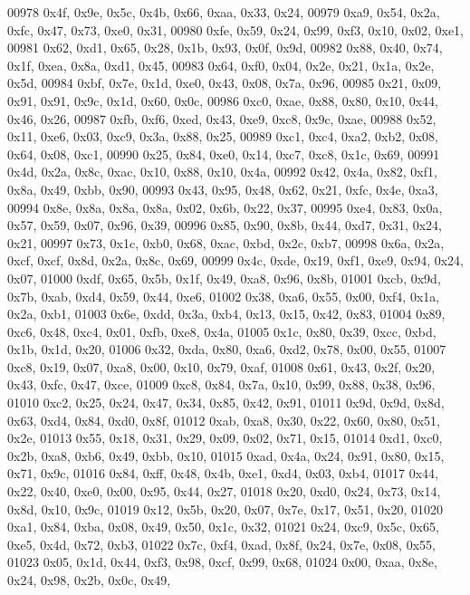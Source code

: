 \begin{DoxyCode}
00978   0x4f, 0x9e, 0x5c, 0x4b, 0x66, 0xaa, 0x33, 0x24,
00979   0xa9, 0x54, 0x2a, 0xfc, 0x47, 0x73, 0xe0, 0x31,
00980   0xfe, 0x59, 0x24, 0x99, 0xf3, 0x10, 0x02, 0xe1,
00981   0x62, 0xd1, 0x65, 0x28, 0x1b, 0x93, 0x0f, 0x9d,
00982   0x88, 0x40, 0x74, 0x1f, 0xea, 0x8a, 0xd1, 0x45,
00983   0x64, 0xf0, 0x04, 0x2e, 0x21, 0x1a, 0x2e, 0x5d,
00984   0xbf, 0x7e, 0x1d, 0xe0, 0x43, 0x08, 0x7a, 0x96,
00985   0x21, 0x09, 0x91, 0x91, 0x9c, 0x1d, 0x60, 0x0c,
00986   0xc0, 0xae, 0x88, 0x80, 0x10, 0x44, 0x46, 0x26,
00987   0xfb, 0xf6, 0xed, 0x43, 0xe9, 0xc8, 0x9c, 0xae,
00988   0x52, 0x11, 0xe6, 0x03, 0xc9, 0x3a, 0x88, 0x25,
00989   0xc1, 0xc4, 0xa2, 0xb2, 0x08, 0x64, 0x08, 0xc1,
00990   0x25, 0x84, 0xe0, 0x14, 0xc7, 0xc8, 0x1c, 0x69,
00991   0x4d, 0x2a, 0x8c, 0xac, 0x10, 0x88, 0x10, 0x4a,
00992   0x42, 0x4a, 0x82, 0xf1, 0x8a, 0x49, 0xbb, 0x90,
00993   0x43, 0x95, 0x48, 0x62, 0x21, 0xfc, 0x4e, 0xa3,
00994   0x8e, 0x8a, 0x8a, 0x8a, 0x02, 0x6b, 0x22, 0x37,
00995   0xe4, 0x83, 0x0a, 0x57, 0x59, 0x07, 0x96, 0x39,
00996   0x85, 0x90, 0x8b, 0x44, 0xd7, 0x31, 0x24, 0x21,
00997   0x73, 0x1c, 0xb0, 0x68, 0xac, 0xbd, 0x2c, 0xb7,
00998   0x6a, 0x2a, 0xcf, 0xcf, 0x8d, 0x2a, 0x8c, 0x69,
00999   0x4c, 0xde, 0x19, 0xf1, 0xe9, 0x94, 0x24, 0x07,
01000   0xdf, 0x65, 0x5b, 0x1f, 0x49, 0xa8, 0x96, 0x8b,
01001   0xcb, 0x9d, 0x7b, 0xab, 0xd4, 0x59, 0x44, 0xe6,
01002   0x38, 0xa6, 0x55, 0x00, 0xf4, 0x1a, 0x2a, 0xb1,
01003   0x6e, 0xdd, 0x3a, 0xb4, 0x13, 0x15, 0x42, 0x83,
01004   0x89, 0xc6, 0x48, 0xc4, 0x01, 0xfb, 0xe8, 0x4a,
01005   0x1c, 0x80, 0x39, 0xcc, 0xbd, 0x1b, 0x1d, 0x20,
01006   0x32, 0xda, 0x80, 0xa6, 0xd2, 0x78, 0x00, 0x55,
01007   0xc8, 0x19, 0x07, 0xa8, 0x00, 0x10, 0x79, 0xaf,
01008   0x61, 0x43, 0x2f, 0x20, 0x43, 0xfc, 0x47, 0xce,
01009   0xc8, 0x84, 0x7a, 0x10, 0x99, 0x88, 0x38, 0x96,
01010   0xc2, 0x25, 0x24, 0x47, 0x34, 0x85, 0x42, 0x91,
01011   0x9d, 0x9d, 0x8d, 0x63, 0xd4, 0x84, 0xd0, 0x8f,
01012   0xab, 0xa8, 0x30, 0x22, 0x60, 0x80, 0x51, 0x2e,
01013   0x55, 0x18, 0x31, 0x29, 0x09, 0x02, 0x71, 0x15,
01014   0xd1, 0xc0, 0x2b, 0xa8, 0xb6, 0x49, 0xbb, 0x10,
01015   0xad, 0x4a, 0x24, 0x91, 0x80, 0x15, 0x71, 0x9c,
01016   0x84, 0xff, 0x48, 0x4b, 0xe1, 0xd4, 0x03, 0xb4,
01017   0x44, 0x22, 0x40, 0xe0, 0x00, 0x95, 0x44, 0x27,
01018   0x20, 0xd0, 0x24, 0x73, 0x14, 0x8d, 0x10, 0x9c,
01019   0x12, 0x5b, 0x20, 0x07, 0x7e, 0x17, 0x51, 0x20,
01020   0xa1, 0x84, 0xba, 0x08, 0x49, 0x50, 0x1c, 0x32,
01021   0x24, 0xc9, 0x5c, 0x65, 0xe5, 0x4d, 0x72, 0xb3,
01022   0x7c, 0xf4, 0xad, 0x8f, 0x24, 0x7e, 0x08, 0x55,
01023   0x05, 0x1d, 0x44, 0xf3, 0x98, 0xcf, 0x99, 0x68,
01024   0x00, 0xaa, 0x8e, 0x24, 0x98, 0x2b, 0x0c, 0x49,

\end{DoxyCode}
